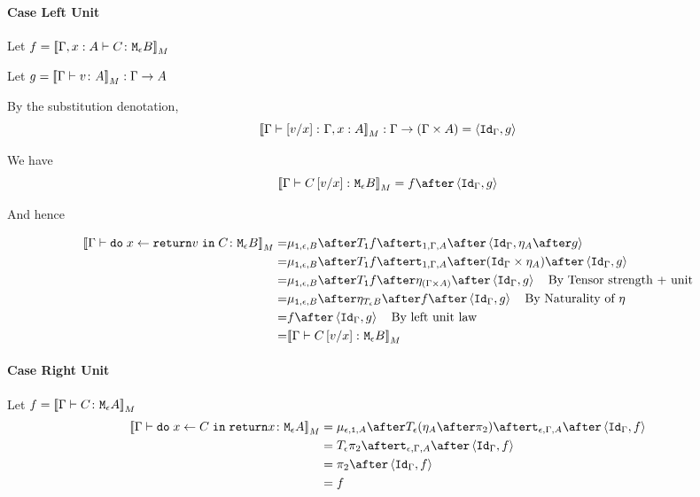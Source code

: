 {    \paragraph{Case Left Unit}
    Let $f = \deno{\typerelation{\gax}{C}{\meb}}$

    Let $g = \deno{\gtyperelation{v}{A}}: \G \rightarrow A$

    By the substitution denotation, $$\deno{\typerelation{\G}{\ssub{x}{v}}{\gax}}: \G \rightarrow (\G \times A) = \pr{\idg}{g}$$

    We have $$\deno{\gtyperelation{C\ssub{x}{v}}{\meb}} = f \after \pr{\idg}{g}$$

    And hence

    \begin{equation}
        \begin{split}
            \deno{\gtyperelation{\doin{x}{\return{v}}{C}}{\meb}} = &  \bind{\1}{\e}{B} \after \T{\1}{f} \after \tstrength{1}{\G}{A} \after \pr{\idg}{\point{A}\after g} \\
            = & \bind{\1}{\e}{B} \after \T{\1}{f} \after \tstrength{1}{\G}{A} \after (\idg\times \point{A}) \after \pr{\idg}{g} \\
            = & \bind{\1}{\e}{B} \after \T{\1}{f} \after \point{(\G \times A)} \after \pr{\idg}{g} \qt{By Tensor strength + unit}\\
            = & \bind{\1}{\e}{B}\after\point{\teb}\after f\after\pr{\idg}{g} \qt{By Naturality of $\point{}$}\\
            = & f\after\pr{\idg}{g} \qt{By left unit law}\\
            = & \deno{\gtyperelation{C\ssub{x}{v}}{\meb}}\\
        \end{split}
    \end{equation}


    

    \paragraph{Case Right Unit}
    
    Let $f = \deno{\gtyperelation{C}{\mea}}$ 
        \begin{equation}
        \begin{split}
            \deno{\gtyperelation{\doin{x}{C}{\return{x}}}{\mea}}  & = \bind{\e}{\1}{A} \after \T{\e}{(\point{A} \after \pp)} \after \tstrength{\e}{\G}{A}\after \pr{\idg}{f} \\
            & = \T{\e}{\pp} \after \tstrength{\e}{\G}{A} \after \pr {\idg}{f} \\
            & = \pp \after \pr{\idg}{f}\\
            & = f
        \end{split}
    \end{equation}
    
}

